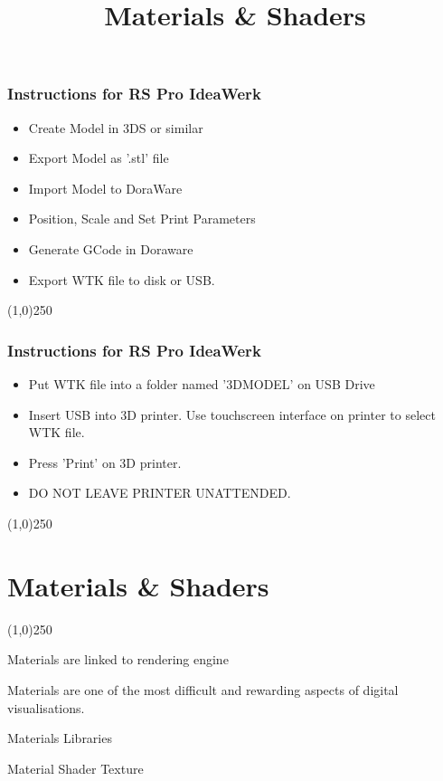 \begin{frame}
\frametitle{Instructions for RS Pro IdeaWerk}
\begin{itemize}
	\item Create Model in 3DS or similar
	\item Export Model as '.stl' file
	\item Import Model to DoraWare
	\item Position, Scale and Set Print Parameters
	\item Generate GCode in Doraware
	\item Export WTK file to disk or USB.
\end{itemize}
\end{frame}
\begin{center}\line(1,0){250}\end{center}


\begin{frame}
\frametitle{Instructions for RS Pro IdeaWerk}
\begin{itemize}
	\item Put WTK file into a folder named '3DMODEL' on USB Drive
	\item Insert USB into 3D printer. Use touchscreen interface on printer to select WTK file.
	\item Press 'Print' on 3D printer.
	\item DO NOT LEAVE PRINTER UNATTENDED.
\end{itemize}
\end{frame}
\begin{center}\line(1,0){250}\end{center}





\section{Materials \& Shaders}
\begin{frame}
\title[Materials \& Shaders]{Materials \& Shaders}
\titlepage
\end{frame}\begin{center}\line(1,0){250}\end{center}

Materials are linked to rendering engine

Materials are one of the most difficult and rewarding aspects of digital visualisations.

Materials Libraries


Material
Shader
Texture

